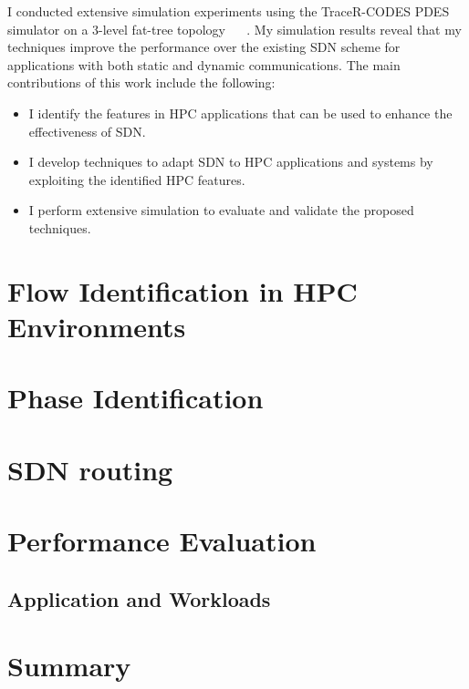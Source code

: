 I conducted extensive simulation experiments using the
TraceR-CODES
\cite{jain2016evaluating,mubarak2016enabling,jain2017predicting}
PDES ~\cite{fujimoto1990parallel} simulator on a 3-level
fat-tree topology ~\cite{leiserson1985fat} ~\cite{al2008scalable}. My
simulation results reveal that my techniques improve the performance
over the existing SDN
scheme for applications with both static and dynamic communications.
The main contributions of this work include the following:
%
\begin{itemize}
\item I identify the features in HPC applications that can be used
  to enhance the effectiveness of SDN.
\item I develop techniques to adapt SDN to HPC applications and
  systems by exploiting the identified HPC features.
\item I perform extensive simulation to evaluate and validate
  the proposed techniques.
\end{itemize}


\section{Flow Identification in HPC Environments}
\label{sec:flow_identification}

\section{Phase Identification}
\label{sec:phase_identification}

\section{SDN routing}
\label{sec:sdn_routing}

\section{Performance Evaluation}

\subsection{Application and Workloads}


\section{Summary}

